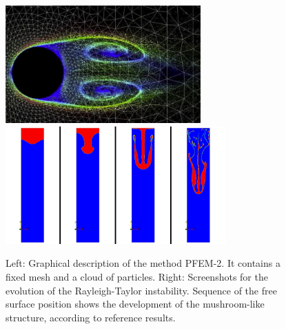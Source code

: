 \documentclass[onecolumn]{elsart3p}
\begin{document}
\begin{figure}[ht]
\centering
\includegraphics[height=4.5cm]{fixedMeshAndParticles.jpg}
\includegraphics[height=4.5cm]{sequence_rayleigh.jpg}
\caption{Left: Graphical description of the method PFEM-2. It contains a fixed mesh and a cloud of particles.\cite{idelsohn_etal_13}
Right: Screenshots for the evolution of the Rayleigh-Taylor instability. Sequence of the free surface position shows the development of the mushroom-like structure, according to reference results.\cite{Strubelj2011}}
\label{foto}
\end{figure}



\end{document}
